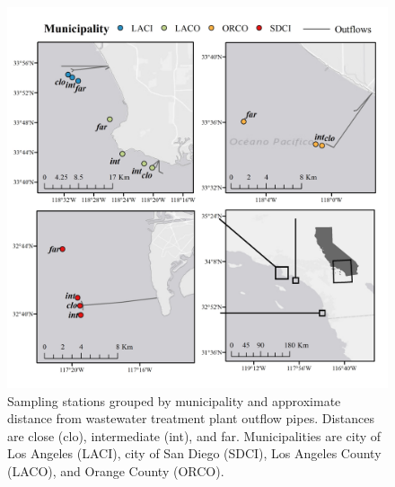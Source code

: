 \documentclass[letterpaper,12pt]{article}\usepackage[]{graphicx}\usepackage[]{color}
\begin{document}
\begin{figure}
\includegraphics[width = \textwidth]{figs/sites.jpg}
\caption{Sampling stations grouped by municipality and approximate distance from wastewater treatment plant outflow pipes. Distances are close (clo), intermediate (int), and far. Municipalities are city of Los Angeles (LACI), city of San Diego (SDCI), Los Angeles County (LACO), and Orange County (ORCO).} 
\end{figure}
\end{document}

